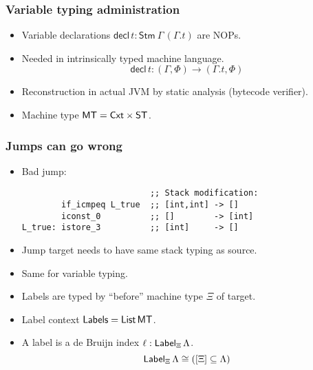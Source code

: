 \documentclass[t,fleqn,usenames,dvipsnames]{beamer}
\newcommand{\Stm}[3][]{\mathsf{Stm}_{#1}\,#2\,#3}
\newcommand{\tdecl}{\mathsf{decl}}
\newcommand{\sublist}{\subseteq}
\newcommand{\ST}{\mathsf{ST}}
\newcommand{\MT}{\mathsf{MT}}
\newcommand{\Labels}{\mathsf{Labels}}
\newcommand{\tLabel}{\mathsf{Label}}
\newcommand{\Label}[2][]{\tLabel_{#1}\,{#2}}
\begin{document}
\begin{frame}%
  \frametitle{Variable typing administration}
  \vspace{-3ex}
  \begin{itemize}
  \item Variable declarations $\tdecl\,t : \Stm \Gamma {(\Gamma.t)}$ are NOPs.
  \item Needed in intrinsically typed machine language.
\[
  \tdecl\,t : {(\Gamma,\Phi)} \to {(\Gamma.t,\Phi)}
\]
\vspace{-2ex}
  \item Reconstruction in actual JVM by static analysis (bytecode verifier).
  \item Machine type $\MT = \Cxt \times \ST$.
  \end{itemize}
\end{frame}


\begin{frame}[fragile=singleslide]
  \frametitle{Jumps can go wrong}
  \vspace{-3ex}
  \begin{itemize}
  \item Bad jump:
\begin{verbatim}
                          ;; Stack modification:
        if_icmpeq L_true  ;; [int,int] -> []
        iconst_0          ;; []        -> [int]
L_true: istore_3          ;; [int]     -> []

\end{verbatim}
  \item Jump target needs to have same stack typing as source.
  \item Same for variable typing.
  \item Labels are typed by ``before'' machine type $\Xi$ of target.
  \item Label context $\Labels = \List\,\MT$.
  \item A label is a de Bruijn index $\ell : \Label[\Xi] \GL$.
\[
  \Label[\Xi] \GL \cong ([\Xi] \sublist \GL)
\]
  \end{itemize}
\end{frame}
\end{document}
